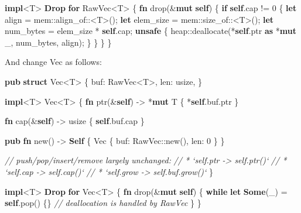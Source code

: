 \documentclass[a4paper,]{book}
\newenvironment{Shaded}{\begin{snugshade}}{\end{snugshade}}
\newcommand{\KeywordTok}[1]{\textcolor[rgb]{0.13,0.29,0.53}{\textbf{{#1}}}}
\newcommand{\DecValTok}[1]{\textcolor[rgb]{0.00,0.00,0.81}{{#1}}}
\newcommand{\CommentTok}[1]{\textcolor[rgb]{0.56,0.35,0.01}{\textit{{#1}}}}
\newcommand{\NormalTok}[1]{{#1}}
\begin{document}
\begin{Shaded}
\begin{Highlighting}[]
\KeywordTok{impl}\NormalTok{<T> }\KeywordTok{Drop} \KeywordTok{for} \NormalTok{RawVec<T> \{}
    \KeywordTok{fn} \NormalTok{drop(&}\KeywordTok{mut} \KeywordTok{self}\NormalTok{) \{}
        \KeywordTok{if} \KeywordTok{self}\NormalTok{.cap != }\DecValTok{0} \NormalTok{\{}
            \KeywordTok{let} \NormalTok{align = mem::align_of::<T>();}
            \KeywordTok{let} \NormalTok{elem_size = mem::size_of::<T>();}
            \KeywordTok{let} \NormalTok{num_bytes = elem_size * }\KeywordTok{self}\NormalTok{.cap;}
            \KeywordTok{unsafe} \NormalTok{\{}
                \NormalTok{heap::deallocate(*}\KeywordTok{self}\NormalTok{.ptr }\KeywordTok{as} \NormalTok{*}\KeywordTok{mut} \NormalTok{_, num_bytes, align);}
            \NormalTok{\}}
        \NormalTok{\}}
    \NormalTok{\}}
\NormalTok{\}}
\end{Highlighting}
\end{Shaded}

And change Vec as follows:

\begin{Shaded}
\begin{Highlighting}[]
\KeywordTok{pub} \KeywordTok{struct} \NormalTok{Vec<T> \{}
    \NormalTok{buf: RawVec<T>,}
    \NormalTok{len: usize,}
\NormalTok{\}}

\KeywordTok{impl}\NormalTok{<T> Vec<T> \{}
    \KeywordTok{fn} \NormalTok{ptr(&}\KeywordTok{self}\NormalTok{) -> *}\KeywordTok{mut} \NormalTok{T \{ *}\KeywordTok{self}\NormalTok{.buf.ptr \}}

    \KeywordTok{fn} \NormalTok{cap(&}\KeywordTok{self}\NormalTok{) -> usize \{ }\KeywordTok{self}\NormalTok{.buf.cap \}}

    \KeywordTok{pub} \KeywordTok{fn} \NormalTok{new() -> }\KeywordTok{Self} \NormalTok{\{}
        \NormalTok{Vec \{ buf: RawVec::new(), len: }\DecValTok{0} \NormalTok{\}}
    \NormalTok{\}}

    \CommentTok{// push/pop/insert/remove largely unchanged:}
    \CommentTok{// * `self.ptr -> self.ptr()`}
    \CommentTok{// * `self.cap -> self.cap()`}
    \CommentTok{// * `self.grow -> self.buf.grow()`}
\NormalTok{\}}

\KeywordTok{impl}\NormalTok{<T> }\KeywordTok{Drop} \KeywordTok{for} \NormalTok{Vec<T> \{}
    \KeywordTok{fn} \NormalTok{drop(&}\KeywordTok{mut} \KeywordTok{self}\NormalTok{) \{}
        \KeywordTok{while} \KeywordTok{let} \KeywordTok{Some}\NormalTok{(_) = }\KeywordTok{self}\NormalTok{.pop() \{\}}
        \CommentTok{// deallocation is handled by RawVec}
    \NormalTok{\}}
\NormalTok{\}}
\end{Highlighting}
\end{Shaded}
\end{document}
